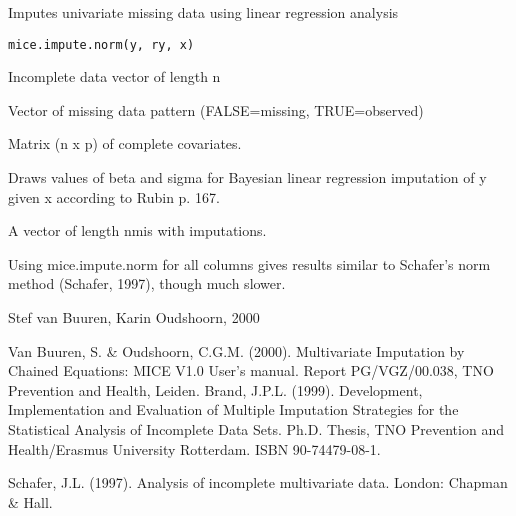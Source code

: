 \documentclass{article}
\begin{document}
\begin{Description}\relax
Imputes univariate missing data using linear regression analysis
\end{Description}
\begin{Usage}
\begin{verbatim}
mice.impute.norm(y, ry, x)
\end{verbatim}
\end{Usage}
\begin{Arguments}
\begin{ldescription}
\item[\code{y}] Incomplete data vector of length n
\item[\code{ry}] Vector of missing data pattern (FALSE=missing, TRUE=observed)
\item[\code{x}] Matrix (n x p) of complete covariates.
\end{ldescription}
\end{Arguments}
\begin{Details}\relax
Draws values of beta and sigma for Bayesian linear regression imputation 
of y given x according to Rubin p. 167.
\end{Details}
\begin{Value}
A vector of length nmis with imputations.
\end{Value}
\begin{Note}\relax
Using mice.impute.norm for all columns gives results similar to Schafer's norm 
method (Schafer, 1997), though much slower.
\end{Note}
\begin{Author}\relax
Stef van Buuren, Karin Oudshoorn, 2000
\end{Author}
\begin{References}\relax
Van Buuren, S. \& Oudshoorn, C.G.M. (2000). Multivariate Imputation by Chained Equations: 
MICE V1.0 User's manual. Report PG/VGZ/00.038, TNO Prevention and Health, Leiden.
Brand, J.P.L. (1999). Development, Implementation and Evaluation of Multiple Imputation Strategies for the Statistical Analysis of Incomplete Data Sets. Ph.D. Thesis, TNO Prevention and Health/Erasmus University Rotterdam. ISBN 90-74479-08-1. 

Schafer, J.L. (1997). Analysis of incomplete multivariate data. London: Chapman \& Hall.
\end{References}
\end{document}
